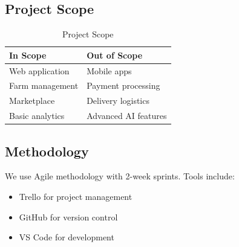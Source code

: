 \subsection{Project Scope}
\begin{table}[H]
    \centering
    \begin{tabular}{|l|l|}
        \hline
        \textbf{In Scope} & \textbf{Out of Scope} \\
        \hline
        Web application & Mobile apps \\
        Farm management & Payment processing \\
        Marketplace & Delivery logistics \\
        Basic analytics & Advanced AI features \\
        \hline
    \end{tabular}
    \caption{Project Scope}
    \label{tab:scope}
\end{table}

\subsection{Methodology}
We use Agile methodology with 2-week sprints. Tools include:
\begin{itemize}[leftmargin=*]
    \item Trello for project management
    \item GitHub for version control
    \item VS Code for development
\end{itemize}